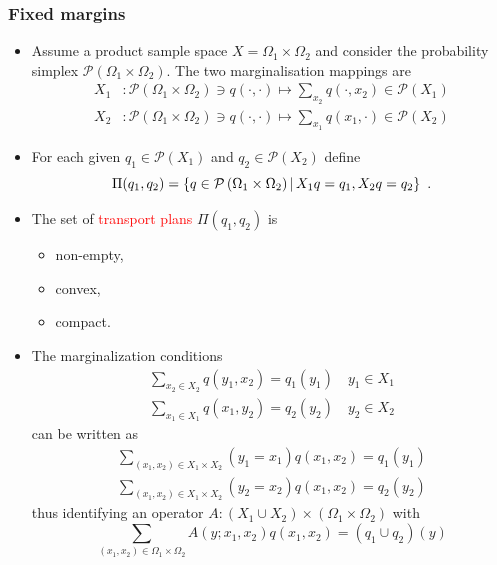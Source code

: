 \documentclass[xcolor=svgnames]{beamer}
\newcommand{\rosso}[1]{\textcolor{red}{#1}}
\newcommand{\simplexon}[1]{\mathcal P\left(#1\right)}
\renewcommand{\emph}{\rosso}
\begin{document}
\begin{frame}\small\frametitle{Fixed margins}
\begin{itemize}
    \item Assume a product sample space $X = \Omega_1 \times \Omega_2$ and consider the probability simplex $\simplexon{\Omega_1 \times \Omega_2}$. The two marginalisation mappings are
    \begin{align*}
 X_1& \colon \simplexon{\Omega_1 \times \Omega_2} \ni q(\cdot,\cdot) \mapsto \sum_{x_2} q(\cdot,x_2) \in  \simplexon{X_1}  \\
 X_2& \colon \simplexon{\Omega_1 \times \Omega_2} \ni q(\cdot,\cdot) \mapsto \sum_{x_1} q(x_1,\cdot) \in  \simplexon{X_2} 
    \end{align*}
    \item For each given $q_1 \in \simplexon{X_1}$ and $q_2 \in \simplexon{X_2}$ define 
    \begin{equation*}
        \Pi(q_1,q_2) = \setof{q \in \simplexon{\Omega_1 \times \Omega_2}} {X_1 q = q_1, X_2 q = q_2} \ .
    \end{equation*}
    \item The set of \emph{transport plans}  $\Pi(q_1,q_2)$ is \begin{itemize} \item non-empty, \item convex, \item compact.
    \end{itemize}

    \item The marginalization conditions
    \begin{gather*}
        \sum_{x_2 \in X_2} q(y_1,x_2) = q_1(y_1) \quad y_1 \in X_1 \\
            \sum_{x_1 \in X_1} q(x_1,y_2) = q_2(y_2) \quad y_2 \in X_2
    \end{gather*}
    can be written as
    \begin{gather*}
        \sum_{(x_1,x_2) \in X_1\times X_2} (y_1 = x_1) q(x_1,x_2) = q_1(y_1) \\
             \sum_{(x_1,x_2) \in X_1\times X_2} (y_2 = x_2) q(x_1,x_2) = q_2(y_2)
    \end{gather*}
    thus identifying an operator $A \colon (X_1 \cup X_2) \times (\Omega_1 \times \Omega_2)$ with
    \begin{equation*}
     \sum_{(x_1,x_2) \in \Omega_1 \times \Omega_2} A(y;x_1,x_2) q(x_1,x_2) = (q_1 \cup q_2)(y)    
    \end{equation*}
\end{itemize}    
\end{frame}
\end{document}

